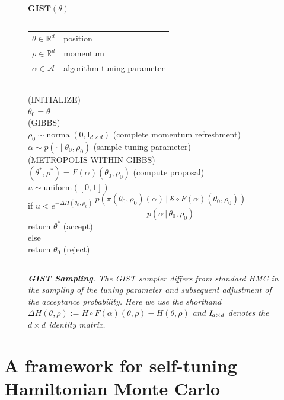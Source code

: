 \documentclass[letterpaper,11pt]{article}
\theoremstyle{plain}%
\theoremstyle{remark}
\begin{document}
\begin{figure}[t]
\begin{flushleft}
$\textbf{GIST}(\theta)$
\vspace*{2pt}
\hrule
\vspace*{2pt}
\begin{tabular}{ll}
$\theta \in \mathbb{R}^d$ & position
\\
$\rho \in \mathbb{R}^d$ & momentum
\\
$\alpha \in \mathcal{A}$ & algorithm tuning parameter
\end{tabular}
\vspace*{4pt}
\hrule
\vspace*{8pt}
{\footnotesize (INITIALIZE)} \\[2pt]
$\theta_0 = \theta$
\\[12pt]
{\footnotesize (GIBBS)} \\[2pt]
 $\rho_0 \sim \textrm{normal}(0, \textrm{I}_{d \times d})$ \hfill (complete momentum refreshment)
\\[4pt]
$\alpha \sim p(\cdot \mid \theta_0, \rho_0)$ \hfill (sample tuning parameter)
\\[12pt]
{\footnotesize (METROPOLIS-WITHIN-GIBBS)} \\[2pt]
 $(\theta^*, \rho^*) = F(\alpha)(\theta_0, \rho_0)$ \hfill (compute proposal)
\\[4pt]
$u \sim \textrm{uniform}([0, 1])$ 
\\[4pt]
if $u < e^{-\Delta H(\theta_0,\rho_0)} \, \dfrac{p\left( \pi(\theta_0, \rho_0)(\alpha) \, | \, \mathcal{S} \circ F(\alpha)(\theta_0, \rho_0) \right)}{p \left(\alpha\, | \, \theta_0, \rho_0 \right)} $  \\
\null \quad return $\theta^*$ \hfill (accept) 
\\[6pt]
else \\[-6pt]
\null \quad return $\theta_0$ \hfill (reject)
\vspace*{4pt}
\hrule
\caption{\it {\bfseries  GIST Sampling}.  The GIST sampler differs from standard HMC in the sampling of the tuning parameter and subsequent adjustment of the acceptance probability.  Here we use the shorthand $\Delta H(\theta, \rho) := H \circ F(\alpha)(\theta,\rho) - H(\theta, \rho)$ and $\emph{I}_{d \times d}$ denotes the $d \times d$ identity matrix.}
\label{fig:general-self-tuning-step}
\end{flushleft}
\end{figure}

\section{A framework for self-tuning Hamiltonian Monte Carlo}
\end{document}
